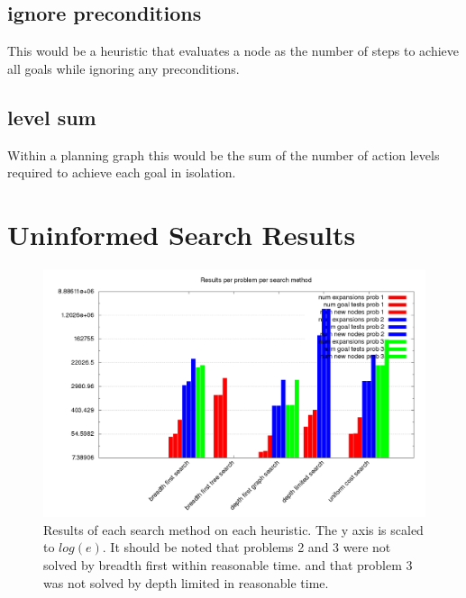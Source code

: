 \documentclass[11pt]{article}
\begin{document}
\subsection{ignore preconditions}
This would be a heuristic that evaluates a node as the number of steps to achieve all goals while ignoring any preconditions.


\subsection{level sum}
Within a planning graph this would be the sum of the number of action levels required to achieve each goal in isolation.


\section{Uninformed Search Results}

\begin{figure}[H]
	\includegraphics[scale=0.32]{results_summary.png}
	\caption{Results of each search method on each heuristic. The y axis is scaled to $log(e)$.
			 It should be noted that problems 2 and 3 were not solved by breadth first within reasonable time. and that problem 3 was not solved by depth limited in reasonable time.}
	\label{uninformed_results_summary}
\end{figure}
\end{document}
